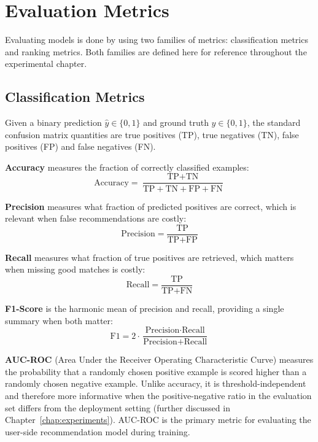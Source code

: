\section{Evaluation Metrics}
\label{sec:prelim_metrics}

Evaluating models is done by using two families of metrics: classification metrics and ranking metrics. Both families are defined here for reference throughout the experimental chapter.

\subsection{Classification Metrics}
\label{sec:prelim_classification}

Given a binary prediction $\hat{y} \in \{0,1\}$ and ground truth $y \in \{0,1\}$, the standard confusion matrix quantities are true positives (TP), true negatives (TN), false positives (FP) and false negatives (FN).

\textbf{Accuracy} measures the fraction of correctly classified examples:
\begin{equation}
    \text{Accuracy} = \frac{\text{TP} + \text{TN}}{\text{TP} + \text{TN} + \text{FP} + \text{FN}}
\end{equation}

\textbf{Precision} measures what fraction of predicted positives are correct, which is relevant when false recommendations are costly:
\begin{equation}
    \text{Precision} = \frac{\text{TP}}{\text{TP} + \text{FP}}
\end{equation}

\textbf{Recall} measures what fraction of true positives are retrieved, which matters when missing good matches is costly:
\begin{equation}
    \text{Recall} = \frac{\text{TP}}{\text{TP} + \text{FN}}
\end{equation}

\textbf{F1-Score} is the harmonic mean of precision and recall, providing a single summary when both matter:
\begin{equation}
    \text{F1} = 2 \cdot \frac{\text{Precision} \cdot \text{Recall}}{\text{Precision} + \text{Recall}}
\end{equation}

\textbf{AUC-ROC} (Area Under the Receiver Operating Characteristic Curve) measures the probability that a randomly chosen positive example is scored higher than a randomly chosen negative example. Unlike accuracy, it is threshold-independent and therefore more informative when the positive-negative ratio in the evaluation set differs from the deployment setting (further discussed in Chapter~\ref{chap:experiments}). \gls{AUC-ROC} is the primary metric for evaluating the user-side recommendation model during training.

